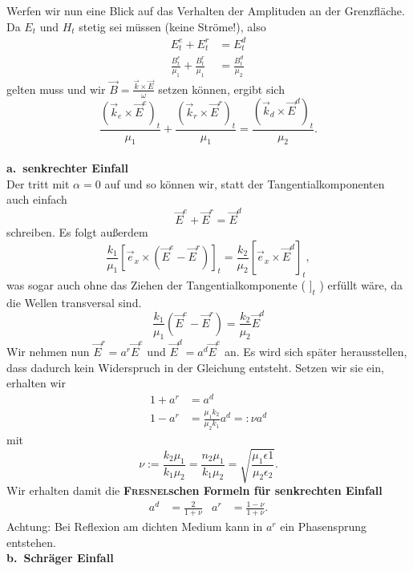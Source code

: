 Werfen wir nun eine Blick auf das Verhalten der Amplituden an der Grenzfläche. Da $E_t$ und $H_t$ stetig sei müssen (keine Ströme!), also
\begin{align*}
E_t^e+E_t^r &= E_t^d\\
\frac{B_t^e}{\mu_1}+\frac{B_t^r}{\mu_1} &= \frac{B_t^d}{\mu_2}
\end{align*}
gelten muss und wir $\vec{B}=\frac{\vec{k}\times\vec{E}}{\omega}$ setzen können, ergibt sich
\begin{equation*}
\frac{(\vec{k}_e\times\vec{E}^e)_t}{\mu_1}+\frac{(\vec{k}_r\times\vec{E}^r)_t}{\mu_1} = \frac{(\vec{k}_d\times\vec{E}^d)_t}{\mu_2}.
\end{equation*}
\ \\
\textbf{a.\ senkrechter Einfall}\\

Der tritt mit $\alpha=0$ auf und so können wir, statt der Tangentialkomponenten auch einfach
\begin{equation*}
\vec{E}^e + \vec{E}^r = \vec{E}^d
\end{equation*}
schreiben. Es folgt außerdem
\begin{equation*}
\frac{k_1}{\mu_1}\left[\vec{e}_x\times\left(\vec{E}^e-\vec{E}^r\right)\right]_t = \frac{k_2}{\mu_2}\left[\vec{e}_x\times\vec{E}^d\right]_t,
\end{equation*}
was sogar auch ohne das Ziehen der Tangentialkomponente ( $]_t$ ) erfüllt wäre, da die Wellen transversal sind. 
\begin{equation*}
\frac{k_1}{\mu_1}\left(\vec{E}^e-\vec{E}^r\right) = \frac{k_2}{\mu_2}\vec{E}^d
\end{equation*}
Wir nehmen nun $\vec{E}^r=a^r\vec{E}^e$ und $\vec{E}^d=a^d\vec{E}^e$ an. Es wird sich später herausstellen, dass dadurch kein Widerspruch in der Gleichung entsteht. Setzen wir sie ein, erhalten wir
\begin{align*}
1+a^r&=a^d\\
1-a^r&=\frac{\mu_1k_2}{\mu_2k_1}a^d=:\nu a^d
\end{align*}
mit
\begin{equation*}
\nu:=\frac{k_2\mu_1}{k_1\mu_2}=\frac{n_2\mu_1}{k_1\mu_2}=\sqrt{\frac{\mu_1\epsilon1}{\mu_2\epsilon_2}}.
\end{equation*}
Wir erhalten damit die \textbf{\textsc{Fresnel}schen Formeln für senkrechten Einfall}
\begin{align*}
a^d&=\frac{2}{1+\nu} & a^r &=\frac{1-\nu}{1+\nu}.
\end{align*}
Achtung: Bei Reflexion am dichten Medium kann in $a^r$ ein Phasensprung entstehen.\\
\newpage
\textbf{b.\ Schräger Einfall}\\

